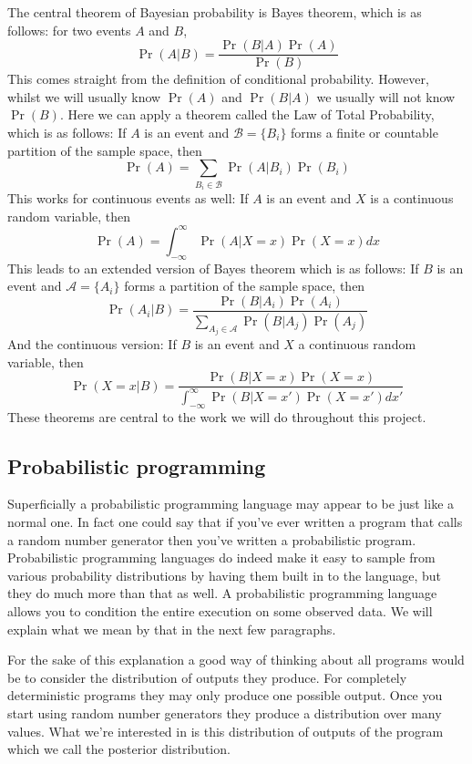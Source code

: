 \documentclass[a4paper]{article}
\begin{document}
The central theorem of Bayesian probability is Bayes theorem, which is as follows: for two events \(A\) and \(B\),
\[\Pr(A | B) = \frac{\Pr(B | A) \Pr(A)}{\Pr(B)}\]
This comes straight from the definition of conditional probability. However, whilst we will usually know \(\Pr(A)\) and \(\Pr(B | A)\) we usually will not know \(\Pr(B)\). Here we can apply a theorem called the Law of Total Probability, which is as follows: If \(A\) is an event and \(\mathcal B = \{B_i\}\) forms a finite or countable partition of the sample space, then
\[\Pr(A) = \sum_{B_i \in \mathcal B} \Pr(A | B_i) \Pr(B_i)\]
This works for continuous events as well: If \(A\) is an event and \(X\) is a continuous random variable, then
\[\Pr(A) = \int_{-\infty}^\infty \Pr(A | X = x) \Pr(X = x) dx\]
This leads to an extended version of Bayes theorem which is as follows: If \(B\) is an event and \(\mathcal A = \{A_i\}\) forms a partition of the sample space, then
\[\Pr(A_i | B) = \frac{\Pr(B | A_i) \Pr(A_i)}{\sum_{A_j \in \mathcal A} \Pr(B | A_j) \Pr(A_j)}\]
And the continuous version: If \(B\) is an event and \(X\) a continuous random variable, then
\[\Pr(X = x | B) = \frac{\Pr(B | X = x) \Pr(X = x)}{\int_{-\infty}^\infty \Pr(B | X = x') \Pr(X = x') dx'}\]
These theorems are central to the work we will do throughout this project.




\subsection{Probabilistic programming}

Superficially a probabilistic programming language may appear to be just like a normal one. In fact one could say that if you've ever written a program that calls a random number generator then you've written a probabilistic program. Probabilistic programming languages do indeed make it easy to sample from various probability distributions by having them built in to the language, but they do much more than that as well. A probabilistic programming language allows you to condition the entire execution on some observed data. We will explain what we mean by that in the next few paragraphs.

For the sake of this explanation a good way of thinking about all programs would be to consider the distribution of outputs they produce. For completely deterministic programs they may only produce one possible output. Once you start using random number generators they produce a distribution over many values. What we're interested in is this distribution of outputs of the program which we call the posterior distribution.
\end{document}
